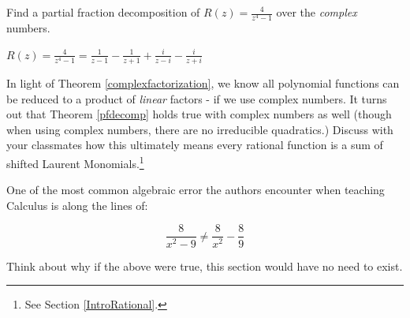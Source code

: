 \documentclass{ximera}
\begin{document}
\begin{problem}
Find a partial fraction decomposition of $R(z) = \frac{4}{z^4-1}$ over the \textit{complex} numbers.

\begin{solution}
$R(z) = \frac{4}{z^4-1} = \frac{1}{z-1} - \frac{1}{z+1} + \frac{i}{z-i} -  \frac{i}{z+i} $
\end{solution}
\end{problem}

\begin{problem}
In light of Theorem \ref{complexfactorization}, we know all polynomial functions can be reduced to a product of \textit{linear} factors - if we use complex numbers.  It turns out that Theorem \ref{pfdecomp} holds true with complex numbers as well (though when using complex numbers, there are no irreducible quadratics.)  Discuss with your classmates how this ultimately means every rational function is a sum of shifted Laurent Monomials.\footnote{See Section \ref{IntroRational}.}
\end{problem}  

\begin{problem}
One of the most common algebraic error the authors encounter when teaching  Calculus is along the lines of:

\[ \frac{8}{x^2 - 9} \neq \frac{8}{x^2} - \frac{8}{9}\]

Think about  why if the above were true, this section would have no need to exist.
\end{problem}
\end{document}
